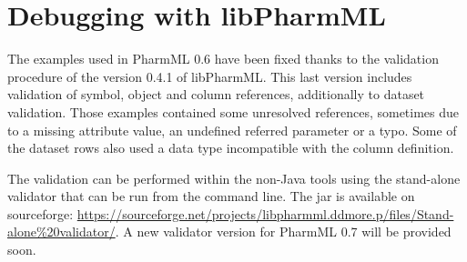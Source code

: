 \section{Debugging with libPharmML}
The examples used in PharmML 0.6 have been fixed thanks to the validation procedure 
of the version 0.4.1 of libPharmML. This last version includes validation of symbol, object 
and column references, additionally to dataset validation.  Those examples contained 
some unresolved references, sometimes due to a missing  attribute value, an 
undefined referred parameter or a typo. Some of the dataset rows also used a data 
type incompatible with the column definition.

The validation can be performed within the non-Java tools using the stand-alone 
validator that can be run from the command line. The jar is available on sourceforge: 
\url{https://sourceforge.net/projects/libpharmml.ddmore.p/files/Stand-alone%20validator/}. 
A new validator version for PharmML 0.7 will be provided soon.

